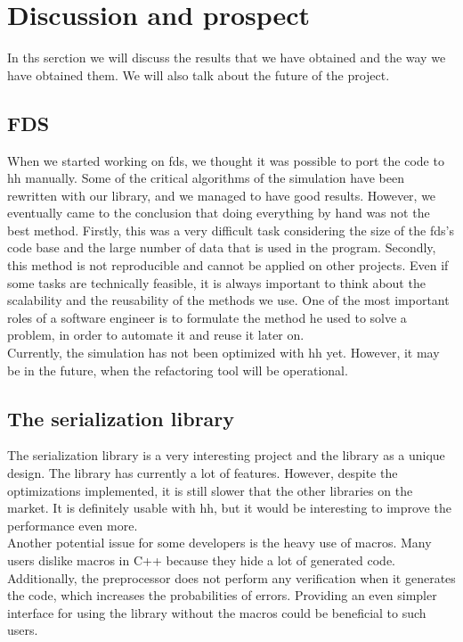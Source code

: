 
\clearpage
\section{Discussion and prospect}

In ths serction we will discuss the results that we have obtained and the way we
have obtained them. We will also talk about the future of the project.

\subsection{FDS}

When we started working on \gls{fds}, we thought it was possible to port the
code to \gls{hh} manually. Some of the critical algorithms of the simulation
have been rewritten with our library, and we managed to have good results.
However, we eventually came to the conclusion that doing everything by hand was
not the best method. Firstly, this was a very difficult task considering the
size of the \gls{fds}'s code base and the large number of data that is used in
the program. Secondly, this method is not reproducible and cannot be applied on
other projects. Even if some tasks are technically feasible, it is always
important to think about the scalability and the reusability of the methods we
use. One of the most important roles of a software engineer is to formulate the
method he used to solve a problem, in order to automate it and reuse it later
on.\\

Currently, the simulation has not been optimized with \gls{hh} yet. However, it
may be in the future, when the refactoring tool will be operational.

\subsection{The serialization library}

The serialization library is a very interesting project and the library as a
unique design. The library has currently a lot of features. However, despite the
optimizations implemented, it is still slower that the other libraries on the
market. It is definitely usable with \gls{hh}, but it would be interesting to
improve the performance even more.\\

Another potential issue for some developers is the heavy use of macros. Many
users dislike macros in C++ because they hide a lot of generated code.
Additionally, the preprocessor does not perform any verification when it
generates the code, which increases the probabilities of errors. Providing an
even simpler interface for using the library without the macros could be
beneficial to such users.
